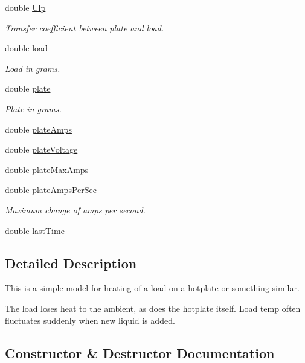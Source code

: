 \begin{DoxyCompactItemize}
double \mbox{\hyperlink{class_model_a6fc46b2708f4a8adf661b6017100d468}{Ulp}}
\begin{DoxyCompactList}\small\item\em Transfer coefficient between plate and load. \end{DoxyCompactList}\item 
double \mbox{\hyperlink{class_model_a2514b312b1eb77ad0a09b80216bb54e3}{load}}
\begin{DoxyCompactList}\small\item\em Load in grams. \end{DoxyCompactList}\item 
double \mbox{\hyperlink{class_model_a15824807b04be7c57d69f6a284772f2d}{plate}}
\begin{DoxyCompactList}\small\item\em Plate in grams. \end{DoxyCompactList}\item 
double \mbox{\hyperlink{class_model_a35f477e5c5286066fe10cdb25e32203f}{plate\+Amps}}
\item 
double \mbox{\hyperlink{class_model_a1889ea7cb9469a56fd8ad85ce064c937}{plate\+Voltage}}
\item 
double \mbox{\hyperlink{class_model_a2e4045381bc766f26eafb15dfc66c26b}{plate\+Max\+Amps}}
\item 
double \mbox{\hyperlink{class_model_ad619a4ed5e8532ca3dc2f002ddb36e7e}{plate\+Amps\+Per\+Sec}}
\begin{DoxyCompactList}\small\item\em Maximum change of amps per second. \end{DoxyCompactList}\item 
double \mbox{\hyperlink{class_model_ad504c28adb232f2159ba24a163374f98}{last\+Time}}
\end{DoxyCompactItemize}


\subsection{Detailed Description}
This is a simple model for heating of a load on a hotplate or something similar. 

The load loses heat to the ambient, as does the hotplate itself. Load temp often fluctuates suddenly when new liquid is added. 

\subsection{Constructor \& Destructor Documentation}
\mbox{\label{class_model_abebd94be0a8a1c0f0bd40ade2c4efb71}} 
